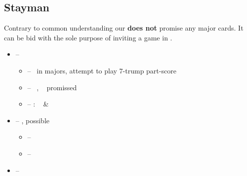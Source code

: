 \subsection{Stayman}
\label{subsec:stayman}

Contrary to common understanding our  \textbf{does not} promise any major cards. It can be bid with the
sole purpose of inviting a game in \nt. \vspace{1em}

\begin{itemize}
  \item \ctr{2\d} -- \art\ \no\ 
  \begin{itemize}
    \item \ctr{2\h} -- \so\ in majors, attempt to play 7-trump part-score
    \item \ctr{2\nt} -- \nat\ \inv, \no\  promissed
    \item \ctr{3\major} -- : \gf\  \& 
  \end{itemize}
  \item \ctr{2\h} -- , possible 
  \begin{itemize}
    \item \ctr{2\s} -- \inv\ 
    \item \ctr{2\nt} -- \inv\ \no\ 
  \end{itemize}
  \item \ctr{2\s} -- 
\end{itemize}
